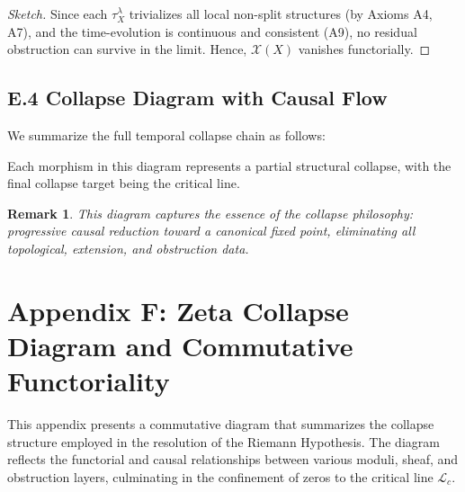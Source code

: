\documentclass[11pt]{article}
\newtheorem{remark}[theorem]{Remark}
\newcommand{\Sha}{\mathcal{X}}
\begin{document}
\begin{proof}[Sketch]
Since each $\tau^\lambda_X$ trivializes all local non-split structures (by Axioms A4, A7),  
and the time-evolution is continuous and consistent (A9), no residual obstruction can survive in the limit.  
Hence, $\Sha(X)$ vanishes functorially.
\end{proof}

\subsection*{E.4 Collapse Diagram with Causal Flow}

We summarize the full temporal collapse chain as follows:
\begin{center}
\end{center}


Each morphism in this diagram represents a partial structural collapse, with the final collapse target being the critical line.

\begin{remark}
This diagram captures the essence of the collapse philosophy:  
progressive causal reduction toward a canonical fixed point, eliminating all topological, extension, and obstruction data.
\end{remark}



\section*{Appendix F: Zeta Collapse Diagram and Commutative Functoriality}

This appendix presents a commutative diagram that summarizes the collapse structure employed in the resolution of the Riemann Hypothesis.  
The diagram reflects the functorial and causal relationships between various moduli, sheaf, and obstruction layers,  
culminating in the confinement of zeros to the critical line $\mathcal{L}_c$.
\end{document}
